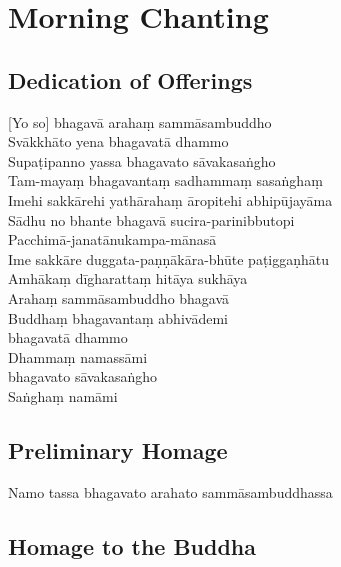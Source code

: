 \chapter{Morning Chanting}

\section{Dedication of Offerings}

[Yo so] bhagavā arahaṃ sammāsambuddho\\
Svākkhāto yena bhagavatā dhammo\\
Supaṭipanno yassa bhagavato sāvakasaṅgho\\
Tam-mayaṃ bhagavantaṃ sadhammaṃ sasaṅghaṃ\\
Imehi sakkārehi yathārahaṃ āropitehi abhipūjayāma\\
Sādhu no bhante bhagavā sucira-parinibbutopi\\
Pacchimā-janatānukampa-mānasā\\
Ime sakkāre duggata-paṇṇākāra-bhūte paṭiggaṇhātu\\
Amhākaṃ dīgharattaṃ hitāya sukhāya\\
Arahaṃ sammāsambuddho bhagavā\\
Buddhaṃ bhagavantaṃ abhivādemi\\\relax
[Svākkhāto] bhagavatā dhammo\\
Dhammaṃ namassāmi\\\relax
[Supaṭipanno] bhagavato sāvakasaṅgho\\
Saṅghaṃ namāmi

\section{Preliminary Homage}

\begin{leader}
\end{leader}

Namo tassa bhagavato arahato sammāsambuddhassa

\section{Homage to the Buddha}

\begin{leader}
\end{leader}

